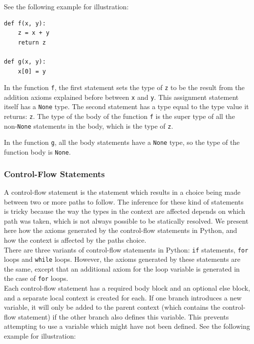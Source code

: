 See the following example for illustration:
\begin{lstlisting}
def f(x, y):
	z = x + y
	return z
	
def g(x, y):
	x[0] = y
\end{lstlisting}

In the function \lstinline|f|, the first statement sets the type of \lstinline|z| to be the result from the addition axioms explained before between \lstinline|x| and \lstinline|y|. This assignment statement itself has a \lstinline|None| type. The second statement has a type equal to the type value it returns: \lstinline|z|.
The type of the body of the function \lstinline|f| is the super type of all the non-\lstinline|None| statements in the body, which is the type of \lstinline|z|.

In the function \lstinline|g|, all the body statements have a \lstinline|None| type, so the type of the function body is \lstinline|None|.

\subsubsection{Control-Flow Statements}
A control-flow statement is the statement which results in a choice being made between two or more paths to follow. The inference for these kind of statements is tricky because the way the types in the context are affected depends on which path was taken, which is not always possible to be statically resolved. We present here how the axioms generated by the control-flow statements in Python, and how the context is affected by the paths choice. \\

There are three variants of control-flow statements in Python: \lstinline|if| statements, \lstinline|for| loops and \lstinline|while| loops. However, the axioms generated by these statements are the same, except that an additional axiom for the loop variable is generated in the case of \lstinline|for| loops. \\

Each control-flow statement has a required body block and an optional else block, and a separate local context is created for each. If one branch introduces a new variable, it will only be added to the parent context (which contains the control-flow statement) if the other branch also defines this variable. This prevents attempting to use a variable which might have not been defined. See the following example for illustration:

